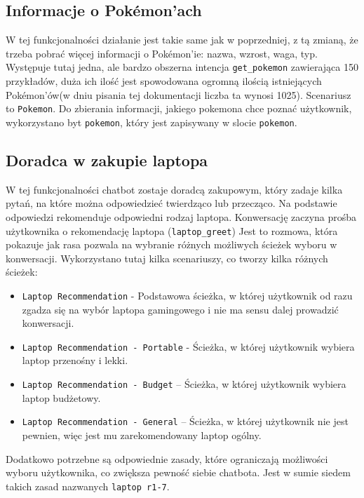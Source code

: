 \documentclass{article}
\begin{document}
\subsection{Informacje o Pokémon'ach}
W tej funkcjonalności działanie jest takie same jak w poprzedniej, z tą
zmianą, że trzeba pobrać więcej informacji o Pokémon'ie:
nazwa, wzrost, waga, typ. Występuje tutaj jedna, ale bardzo obszerna intencja 
\verb|get_pokemon| zawierająca 150 przykładów, duża ich ilość jest spowodowana
ogromną ilością istniejących Pokémon'ów(w dniu pisania tej dokumentacji liczba
ta wynosi 1025). Scenariusz to \verb|Pokemon|. Do zbierania informacji, jakiego
pokemona chce poznać użytkownik, wykorzystano byt \verb|pokemon|, który jest
zapisywany w slocie \verb|pokemon|.

\subsection{Doradca w zakupie laptopa}
W tej funkcjonalności chatbot zostaje doradcą zakupowym, który zadaje kilka
pytań, na które można odpowiedzieć twierdząco lub przecząco. Na podstawie
odpowiedzi rekomenduje odpowiedni rodzaj laptopa. Konwersację zaczyna prośba
użytkownika o rekomendację laptopa (\verb|laptop_greet|) Jest to rozmowa, która
pokazuje jak rasa pozwala na wybranie różnych możliwych ścieżek wyboru w
konwersacji. Wykorzystano tutaj kilka scenariuszy, co tworzy kilka różnych
ścieżek:
\begin{itemize}
    \item[\textcolor{violet}{\textbullet}] \verb|Laptop Recommendation| - Podstawowa ścieżka, w której
        użytkownik od razu zgadza się na wybór laptopa gamingowego i nie ma
        sensu dalej prowadzić konwersacji.
    \item[\textcolor{violet}{\textbullet}] \verb|Laptop Recommendation - Portable| - Ścieżka, w której
        użytkownik wybiera laptop przenośny i lekki.
    \item[\textcolor{violet}{\textbullet}] \verb|Laptop Recommendation - Budget| -- Ścieżka, w której
        użytkownik wybiera laptop budżetowy. 
    \item[\textcolor{violet}{\textbullet}] \verb|Laptop Recommendation - General| -- Ścieżka, w której
        użytkownik nie jest pewnien, więc jest mu zarekomendowany laptop
        ogólny. 
\end{itemize}
Dodatkowo potrzebne są odpowiednie zasady, które ograniczają możliwości
wyboru użytkownika, co zwiększa pewność siebie chatbota. Jest w sumie siedem
takich zasad nazwanych \verb|laptop r1-7|.
\end{document}
